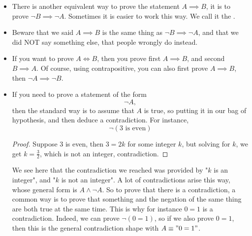 \begin{itemize}
    \item There is another equivalent way to prove the statement \( A \implies B \), it is to prove \( \neg B \implies \neg A \). Sometimes it is easier to work this way. We call it the .
    \item Beware that we said \( A \implies B \) is the same thing as \( \neg B \implies \neg A \), and that we did NOT say something else, that people wrongly do instead. 
    \item If you want to prove \( A \iff B \), then you prove first \( A \implies B \), and second \( B \implies A \). Of course, using contrapositive, you can also first prove \( A \implies B \), then \( \neg A \implies \neg B \).
    
    \item If you need to prove a statement of the form 
    \begin{equation*}
        \neg A,
    \end{equation*}
    then the standard way is to assume that \( A \) is true, so putting it in our bag of hypothesis, and then deduce a contradiction. For instance,
    \begin{equation*}
        \neg(3 \text{ is even})
    \end{equation*}
    \begin{proof}
        Suppose \( 3 \) is even, then \( 3 = 2k \) for some integer \( k \), but solving for \( k \), we get \( k = \frac 3 2 \), which is not an integer, contradiction. 
    \end{proof}
    We see here that the contradiction we reached was provided by "\( k \) is an integer", and "\( k \) is not an integer". A lot of contradictions arise this way, whose general form is \( A \land \neg A \). So to prove that there is a contradiction, a common way is to prove that something and the negation of the same thing are both true at the same time. This is why for instance \( 0 = 1 \) is a contradiction. Indeed, we can prove \( \neg (0 = 1) \), so if we also prove \( 0 = 1 \), then this is the general contradiction shape with \( A \equiv "0 = 1" \).
\end{itemize}

